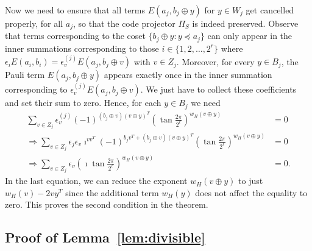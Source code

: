 \documentclass[twoside,romanappendices]{IEEEtran}
\begin{document}
Now we need to ensure that all terms $E(a_j, b_j \oplus y)$ for $y \in W_j$ get cancelled properly, for all $a_j$, so that the code projector $\Pi_S$ is indeed preserved.
Observe that terms corresponding to the coset $\{ b_j \oplus y \colon y \preceq a_j \}$ can only appear in the inner summations corresponding to those $i \in \{ 1,2,\ldots,2^r \}$ where $\epsilon_i E(a_i, b_i) = \epsilon_v^{(j)} E(a_j, b_j \oplus v)$ with $v \in Z_j$.
Moreover, for every $y \in B_j$, the Pauli term $E(a_j, b_j \oplus y)$ appears exactly once in the inner summation corresponding to $\epsilon_v^{(j)} E(a_j, b_j \oplus v)$.
We just have to collect these coefficients and set their sum to zero.
Hence, for each $y \in B_j$ we need
\begin{align}
\sum_{v \in Z_j} \epsilon_v^{(j)} (-1)^{(b_j \oplus v) (v \oplus y)^T} \left( \tan\frac{2\pi}{2^\ell} \right)^{w_H(v \oplus y)} & = 0 \\
%
\Rightarrow \sum_{v \in Z_j} \epsilon_j \epsilon_v \imath^{vv^T} (-1)^{b_j v^T + (b_j \oplus v) (v \oplus y)^T} \left( \tan\frac{2\pi}{2^\ell} \right)^{w_H(v \oplus y)} & = 0 \\
%
\Rightarrow \sum_{v \in Z_j} \epsilon_v \left( \imath \tan\frac{2\pi}{2^\ell} \right)^{w_H(v \oplus y)} & = 0.
\end{align}
In the last equation, we can reduce the exponent $w_H(v \oplus y)$ to just $w_H(v) - 2vy^T$ since the additional term $w_H(y)$ does not affect the equality to zero.
This proves the second condition in the theorem. \hfill \IEEEQEDhere



\subsection{Proof of Lemma~\ref{lem:divisible}}
\label{sec:proof_divisible}
\end{document}
